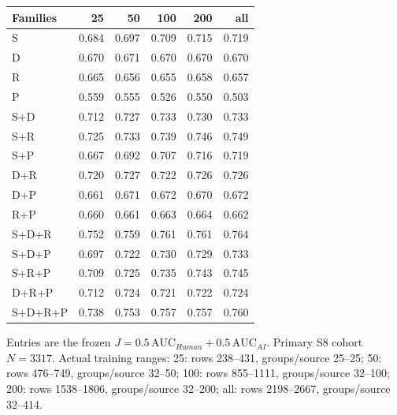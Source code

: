 \begin{tabular}{lrrrrr}
\toprule
Families & 25 & 50 & 100 & 200 & all \\
\midrule
S & 0.684 & 0.697 & 0.709 & 0.715 & 0.719 \\
D & 0.670 & 0.671 & 0.670 & 0.670 & 0.670 \\
R & 0.665 & 0.656 & 0.655 & 0.658 & 0.657 \\
P & 0.559 & 0.555 & 0.526 & 0.550 & 0.503 \\
S+D & 0.712 & 0.727 & 0.733 & 0.730 & 0.733 \\
S+R & 0.725 & 0.733 & 0.739 & 0.746 & 0.749 \\
S+P & 0.667 & 0.692 & 0.707 & 0.716 & 0.719 \\
D+R & 0.720 & 0.727 & 0.722 & 0.726 & 0.726 \\
D+P & 0.661 & 0.671 & 0.672 & 0.670 & 0.672 \\
R+P & 0.660 & 0.661 & 0.663 & 0.664 & 0.662 \\
S+D+R & 0.752 & 0.759 & 0.761 & 0.761 & 0.764 \\
S+D+P & 0.697 & 0.722 & 0.730 & 0.729 & 0.733 \\
S+R+P & 0.709 & 0.725 & 0.735 & 0.743 & 0.745 \\
D+R+P & 0.712 & 0.724 & 0.721 & 0.722 & 0.724 \\
S+D+R+P & 0.738 & 0.753 & 0.757 & 0.757 & 0.760 \\
\bottomrule
\end{tabular}
\par\smallskip
{\footnotesize Entries are the frozen $J=0.5\,\mathrm{AUC}_{Human}+0.5\,\mathrm{AUC}_{AI}$. Primary S8 cohort $N=3317$. Actual training ranges: 25: rows 238--431, groups/source 25--25; 50: rows 476--749, groups/source 32--50; 100: rows 855--1111, groups/source 32--100; 200: rows 1538--1806, groups/source 32--200; all: rows 2198--2667, groups/source 32--414.}
